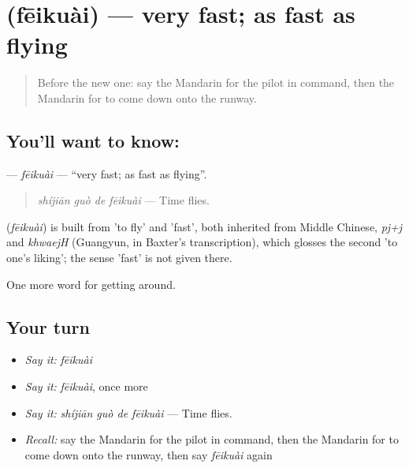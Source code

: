 \section[\texorpdfstring{\zh{飞快} (fēikuài)}{飞快 (fēikuài)}]{ (fēikuài) — very fast; as fast as flying}

\label{lesson:ZH-C413-feikuai}



\begin{quote}
Before the new one: say the Mandarin for the pilot in command, then the Mandarin for to come down onto the runway.
\end{quote}

\subsection*{You'll want to know: }
\textbf{} — \emph{fēikuài} — \textquotedblleft{}very fast; as fast as flying\textquotedblright{}.

\begin{quote}
\textbf{} \emph{shíjiān guò de fēikuài} — Time flies.
\end{quote}

\begin{cousinweb}
\textbf{} (\emph{fēikuài}) is built from  'to fly' and  'fast', both inherited from Middle Chinese, \emph{pj+j} and \emph{khwaejH} (Guangyun, in Baxter's transcription), which glosses the second 'to one's liking'; the sense 'fast' is not given there.
\end{cousinweb}

\begin{grammarlens}[title={What you've built}]
One more word for getting around.
\end{grammarlens}

\subsection*{Your turn}
\begin{itemize}
\raggedright
  \item \emph{Say it:} \emph{fēikuài}
  \item \emph{Say it:} \emph{fēikuài}, once more
  \item \emph{Say it:} \emph{shíjiān guò de fēikuài} — Time flies.
  \item \emph{Recall:} say the Mandarin for the pilot in command, then the Mandarin for to come down onto the runway, then say \emph{fēikuài} again
\end{itemize}

